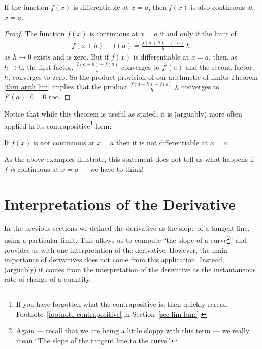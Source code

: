 \begin{theorem}\label{thm:DIFFdiffGivesCont}
If the function $f(x)$ is differentiable at $x=a$, then $f(x)$ is also continuous at $x=a$.
\end{theorem}
\begin{proof}
The function $f(x)$ is continuous at $x=a$ if and only if the limit of
\begin{align*}
f(a+h) - f(a) = \frac{f(a+h)-f(a)}{h}\ h
\end{align*}
as $h\rightarrow 0$ exists and is zero. But if $f(x)$ is differentiable at $x=a$, then,
as $h\rightarrow 0$,  the first factor, $ \frac{f(a+h)-f(a)}{h}$ converges to $f'(a)$
and the second factor, $h$, converges to zero. So the product provision of our
arithmetic of limits Theorem \ref{thm arith lim} implies that the product
$\frac{f(a+h)-f(a)}{h}\ h$ converges to $f'(a)\cdot 0=0$ too.
\end{proof}

Notice that while this theorem is useful as stated, it is (arguably) more often applied in its contrapositive\footnote{If you have forgotten what the contrapositive is, then quickly reread Footnote~\ref{footnote contrapositive} in Section~\ref{sec lim func}.} form:
\begin{theorem}
\label{thm_2_2_1}
 If $f(x)$ is not continuous at $x=a$ then it is not differentiable at $x=a$.
\end{theorem}
As the above examples illustrate, this statement does not tell us what happens if $f$ \emph{is} continuous at $x=a$ --- we have to think!

\section{Interpretations of the Derivative}\label{sec_2_3}


In the previous sections we defined the derivative as the slope of a
tangent line, using a particular limit. This allows us to compute
``the slope of a curve\footnote{Again --- recall that we are being a little sloppy
with this term --- we really mean ``The slope of the tangent line to the curve''.}'' and
provides us with one interpretation of the derivative. However, the main importance of
derivatives does not come from this application. Instead, (arguably) it comes from the
interpretation of the derivative as the instantaneous rate of change of a quantity.

